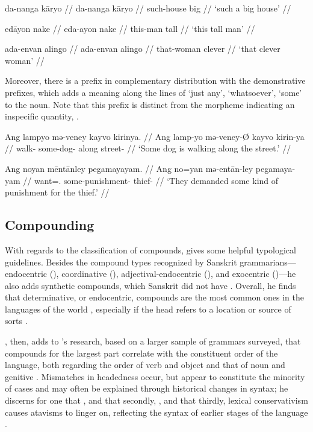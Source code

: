 \pex
\a\begingl
	\gla da-nanga kāryo //
	\glb da-nanga kāryo //
	\glc such-house big //
	\glft `such a big house' //
\endgl

\a\begingl
	\gla edāyon nake //
	\glb eda-ayon nake //
	\glc this-man tall //
	\glft `this tall man' //
\endgl

\a\begingl
	\gla ada-envan alingo //
	\glb ada-envan alingo //
	\glc that-woman clever //
	\glft `that clever woman' //
\endgl

\xe

Moreover, there is a prefix  in complementary distribution with
the demonstrative prefixes, which adds a meaning along the lines of `just any',
`whatsoever', `some' to the noun. Note that this prefix is distinct from the
morpheme indicating an inspecific quantity, .

\pex
\a\begingl
	\gla Ang lampyo mə-veney kayvo kirinya. //
	\glb Ang lamp-yo mə-veney-Ø kayvo kirin-ya //
	\glc \AgtT{} walk-\TsgN{} some-dog-\Top{} along street-\Loc{} //
	\glft `Some dog is walking along the street.' //
\endgl

\a\begingl
	\gla Ang noyan mēntānley pegamayayam. //
	\glb Ang no=yan mə-entān-ley pegamaya-yam //
	\glc \AgtT{} want=\TsgM{}.\Top{} some-punishment-\PargI{} 
		thief-\Dat{} //
	\glft `They demanded some kind of punishment for the thief.' //
\endgl

\xe


\subsection{Compounding}

With regards to the classification of compounds, \citet{bauer2001} gives some 
helpful typological guidelines. Besides the compound types recognized by 
Sanskrit grammarians---endocentric (), coordinative 
(), adjectival-endo\-cent\-ric (), and 
exocentric ()---he also adds synthetic compounds, which Sanskrit 
did not have \citep[697]{bauer2001}. Overall, he finds that determinative, or 
endocentric, compounds are the most common ones in the languages of the world 
\citep[697]{bauer2001}, especially if the head refers to a location or source 
of sorts \citep[702]{bauer2001}.

\citet{gaeta2008}, then, adds to \citeauthor{bauer2001}'s research, based on a 
larger sample of grammars surveyed, that compounds for the largest part 
correlate with the constituent order of the language, both regarding the order 
of verb and object and that of noun and genitive \citep[129--133]{gaeta2008}. 
Mismatches in headedness occur, but appear to constitute the minority of cases 
and may often be explained through historical changes in syntax; he discerns  
for one that , and that secondly, , and that 
thirdly, lexical conservativism causes atavisms to linger on, reflecting the 
syntax of earlier stages of the language \citep[138--139]{gaeta2008}.

